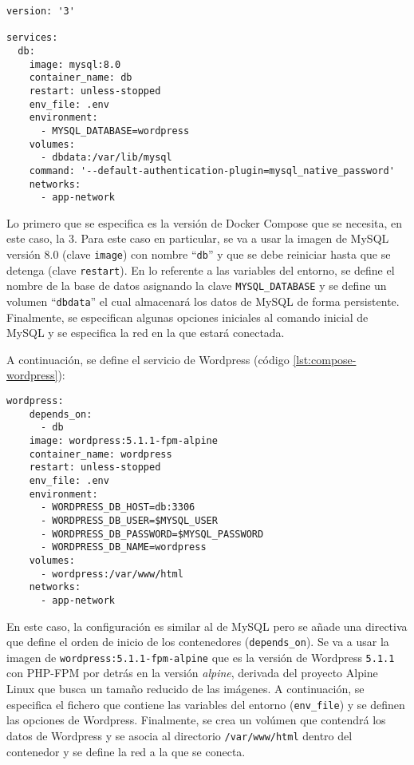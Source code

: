 \begin{lstlisting}[style=docker-compose, caption={Servicio de MySQL para el \textit{stack} Wordpress.}, label={lst:compose-mysql}]
version: '3'

services:
  db:
    image: mysql:8.0
    container_name: db
    restart: unless-stopped
    env_file: .env
    environment:
      - MYSQL_DATABASE=wordpress
    volumes:
      - dbdata:/var/lib/mysql
    command: '--default-authentication-plugin=mysql_native_password'
    networks:
      - app-network
\end{lstlisting}

Lo primero que se especifica es la versión de Docker Compose que se necesita, en
este caso, la $3$. Para este caso en particular, se va a usar la imagen de
MySQL versión 8.0 (clave \texttt{image}) con nombre ``\texttt{db}'' y que se
debe reiniciar hasta que se detenga (clave \texttt{restart}). En lo referente
a las variables del entorno, se define el nombre de la base de datos asignando
la clave \texttt{MYSQL\_DATABASE} y se define un volumen ``\texttt{dbdata}'' el
cual almacenará los datos de MySQL de forma persistente. Finalmente, se especifican
algunas opciones iniciales al comando inicial de MySQL y se especifica la red
en la que estará conectada.

A continuación, se define el servicio de Wordpress (código \ref{lst:compose-wordpress}):

\begin{lstlisting}[style=docker-compose, caption={Servicio de Wordpress.}, label={lst:compose-wordpress}]
  wordpress:
    depends_on:
      - db
    image: wordpress:5.1.1-fpm-alpine
    container_name: wordpress
    restart: unless-stopped
    env_file: .env
    environment:
      - WORDPRESS_DB_HOST=db:3306
      - WORDPRESS_DB_USER=$MYSQL_USER
      - WORDPRESS_DB_PASSWORD=$MYSQL_PASSWORD
      - WORDPRESS_DB_NAME=wordpress
    volumes:
      - wordpress:/var/www/html
    networks:
      - app-network
\end{lstlisting}

En este caso, la configuración es similar al de MySQL pero se añade una directiva
que define el orden de inicio de los contenedores (\texttt{depends\_on}). Se va a
usar la imagen de \texttt{wordpress:5.1.1-fpm-alpine} que es la versión de Wordpress
\texttt{5.1.1} con PHP-FPM por detrás en la versión \textit{alpine}, derivada del
proyecto Alpine Linux que busca un tamaño reducido de las imágenes. A continuación,
se especifica el fichero que contiene las variables del entorno (\texttt{env\_file})
y se definen las opciones de Wordpress. Finalmente, se crea un volúmen que contendrá
los datos de Wordpress y se asocia al directorio \texttt{/var/www/html} dentro
del contenedor y se define la red a la que se conecta.

